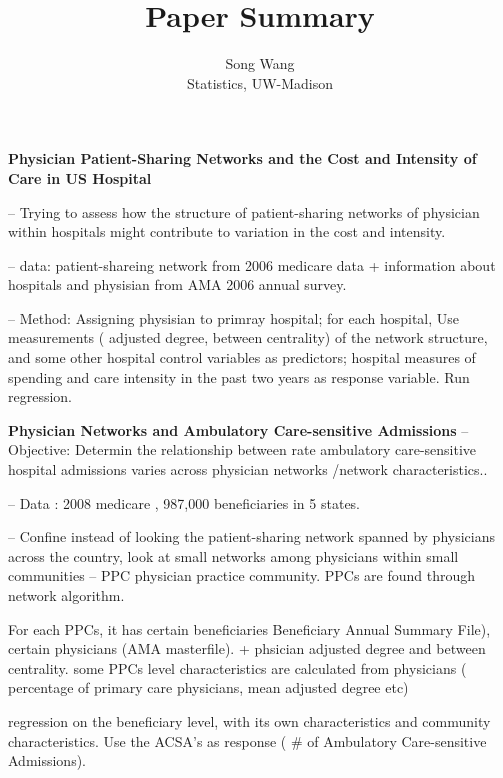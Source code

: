 \documentclass{article}
\title{Paper Summary}
\author{Song Wang\\
Statistics, UW-Madison}
\begin{document}
\maketitle
{\bf Physician Patient-Sharing Networks and the Cost and Intensity of Care in US Hospital}

-- Trying to assess how the structure of patient-sharing networks of physician within hospitals might contribute to variation in the cost and intensity.

-- data: patient-shareing network from 2006 medicare data + information about hospitals and physisian from AMA 2006 annual  survey.

-- Method: Assigning physisian to primray hospital; for each hospital, Use measurements ( adjusted degree, between centrality) of the network structure, and some other hospital control variables as predictors; hospital measures of spending and care intensity in the past two years as response variable. Run regression.

{\bf  Physician Networks and Ambulatory Care-sensitive Admissions}
-- Objective: Determin the relationship between  rate ambulatory care-sensitive hospital admissions varies across physician networks /network characteristics..

-- Data : 2008 medicare , 987,000 beneficiaries in 5 states.

--  Confine instead of looking the patient-sharing network spanned by physicians across the country, look at small networks among physicians within small communities -- PPC physician practice community. PPCs are found through network algorithm.   

    For each PPCs, it has certain beneficiaries Beneficiary Annual Summary File), certain physicians (AMA masterfile). + phsician adjusted degree and between centrality. some PPCs level characteristics are calculated from physicians ( percentage of primary care physicians, mean adjusted degree etc)
    
    regression on the beneficiary level, with its own characteristics and community characteristics. Use the ACSA's as response ( $\#$ of Ambulatory Care-sensitive Admissions).
\end{document}
